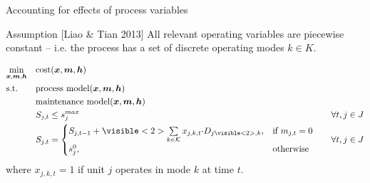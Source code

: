 \documentclass[slides]{beamer}
\begin{document}
\begin{frame}{Accounting for effects of process variables}
\begin{alertblock}{Assumption [Liao \& Tian 2013]}
    All relevant operating variables are piecewise constant -- i.e. the process has a set of discrete operating modes $k \in K$.
\end{alertblock}
    \vspace{-15pt}
    \begin{equation*}
    \begin{aligned}
    & \underset{\bm{x},\bm{m}, \bm{h}}{\text{min}}
    && \text{cost}(\bm{x}, \bm{m},\bm{h})\\
    & \text{s.t.}
    && \text{process model}(\bm{x}, \bm{m},\bm{h})
    &&& \\
    &
    && \text{maintenance model}(\bm{x}, \bm{m} ,\bm{h})
    &&& \\
    &
    && S_{j,t} \leq s_{j}^{max}
    &&& \forall t, j \in J\\
    &
    && S_{j,t} =
    \begin{cases}
        S_{j,t-1} + \visible<2>{\sum\limits_{k \in
        \mathcal{K}}{x_{j,k,t}\cdot}}
        D_{j\visible<2>{,k}}, & \text{if } m_{j,t} = 0\\
    s_{j}^{0}, & \text{otherwise}
    \end{cases}
    &&& \forall t, j \in J\\
    \end{aligned}
    \end{equation*}
    where $x_{j,k,t} = 1$ if unit $j$ operates in mode $k$ at time $t$.
\end{frame}
\end{document}
